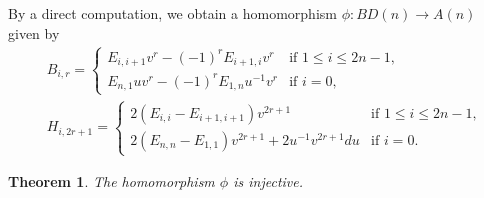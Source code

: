 \documentclass[pdftex]{sigma}
\numberwithin{equation}{section}
\newtheorem{Theorem}{Theorem}[section]
\theoremstyle{definition}
\begin{document}
By a direct computation, we obtain a homomorphism $\phi\colon BD(n)\to A(n)$ given by
\begin{align*}
&B_{i,r}=\begin{cases}
E_{i,i+1}v^r-(-1)^rE_{i+1,i}v^r&\text{if }1\leq i\leq 2n-1,\\
E_{n,1}uv^r-(-1)^rE_{1,n}u^{-1}v^r&\text{if }i=0,
\end{cases}\\
&H_{i,2r+1}=\begin{cases}
2(E_{i,i}-E_{i+1,i+1})v^{2r+1}&\text{if }1\leq i\leq 2n-1,\\
2(E_{n,n}-E_{1,1})v^{2r+1}+2u^{-1}v^{2r+1}du&\text{if }i=0.
\end{cases}
\end{align*}
\begin{Theorem}
The homomorphism $\phi$ is injective.
\end{Theorem}
\end{document}
